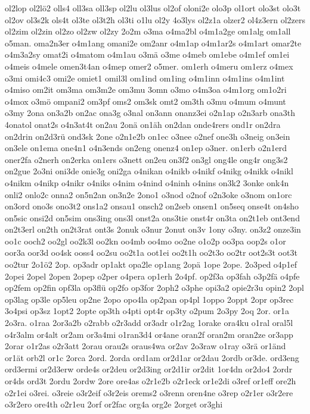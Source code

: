 {ol2lop
ol2lö2
olls4
oll3sa
oll3sp
ol2lu
ol3lus
ol2of
oloni2e
olo3p
ol1ort
olo3st
olo3t
ol2ov
ol3s2k
ols4t
ol3te
ol3t2h
ol3ti
o1lu
ol2y
4o3lys
ol2z1a
olzer2
ol4z3ern
ol2zers
ol2zim
ol2zin
ol2zo
ol2zw
ol2zy
2o2m
o3ma
o4ma2bl
o4m1a2ge
om1alg
om1all
o5man.
oma2n3er
o4m1ang
omani2e
om2anr
o4m1ap
o4m1ar2s
o4m1art
omar2te
o4m3a2sy
omat2i
o4matom
o4m1au
o3mä
o3me
o4meb
om1ebe
o4m1ef
om1ei
o4meis
o4mele
omen3t4an
o4mep
omer2
o5mer.
om1erh
o4meru
om1erz
o4mex
o3mi
omi4c3
omi2e
omiet1
omil3l
om1ind
om1ing
o4m1inn
o4m1ins
o4m1int
o4miso
om2it
om3ma
om3m2e
om3mu
3omn
o3mo
o4m3oa
o4m1org
om1o2ri
o4mox
o3mö
ompani2
om3pf
oms2
om3sk
omt2
om3th
o3mu
o4mum
o4munt
o3my
2ona
on3a2b
on2ac
ona3g
o3nal
on3ann
onanz3ei
o2n1ap
o2n3arb
ona3th
4onatol
onat2s
o4n3at4t
on2au
2onä
on1äh
on2dan
onde4rers
ond1r
on2dra
on2drin
on2d3rü
ond3sk
2one
o2n1e2b
on1ec
o3nee
o2nef
one3h
o3neig
on3ein
on3ele
on1ema
one4n1
o4n3ends
on2eng
onenz4
on1ep
o3ner.
on1erb
o2n1erd
oner2fa
o2nerh
on2erka
on1ers
o3nett
on2eu
on3f2
on3gl
ong4le
ong4r
ong3s2
on2gue
2o3ni
oni3de
onie3g
oni2ga
o4nikan
o4nikb
o4nikf
o4nikg
o4nikk
o4nikl
o4nikm
o4nikp
o4nikr
o4niks
o4nim
o4nind
o4ninh
o4nins
on3k2
3onke
onk4n
onli2
onlo2c
onna2
on5n2an
on3n2e
2ono1
o3nod
o2nof
o2n3oke
o3nom
on1orc
on3ord
ono3s
ono3t2
ons1a2
onsau1
onsch2
on2seb
onsen1
on5seq
onse4t
on4sho
on5sic
onsi2d
on5sim
ons3ing
ons3l
onst2a
ons3tie
onst4r
on3ta
on2t1eb
ont3end
on2t3erl
on2th
on2t3rat
ont3s
2onuk
o3nur
2onut
on3v
1ony
o3ny.
on3z2
onze3in
oo1c
ooch2
oo2gl
oo2k3l
oo2kn
oo4mb
oo4mo
oo2ne
o1o2p
oo3pa
oop2s
o1or
oor3a
oor3d
oo4sk
ooss4
oo2su
oo2t1a
oot1ei
oo2t1h
oo2t3o
oo2tr
oot2s3t
oot3t
oo2tur
2o1ö2
2op.
op3adr
op1akt
opa2le
op1ang
2opä
1ope
2ope.
2o3ped
o4p1ef
2opei
2opel
2open
2opep
o2per
o4pera
op1erh
2o4pf.
op2f3a
op3fah
o3p2fä
o4pfe
op2fem
op2fin
opf3la
op3flü
op2fo
op3for
2oph2
o3phe
opi3a2
opie2r3u
opin2
2opl
op3lag
op3le
op5leu
op2ne
2opo
opo4la
op2pan
op4pl
1oppo
2oppt
2opr
op3rec
3o4psi
op3sz
1opt2
2opte
op3th
o4pti
opt4r
op3ty
o2pum
2o3py
2oq
2or.
or1a
2o3ra.
o1raa
2or3a2b
o2rabb
o2r3add
or3adr
o1r2ag
1orake
ora4ku
o1ral
oral5l
o4r3alm
or4alt
or2am
or3a4mi
o1ran3d4
or4ane
oran2f
oran2m
oran2ze
or3app
2orar
o1r2as
o2r3att
2orau
orau2s
oraus4wa
or2av
2o3raw
o1ray
o3rä
or1änd
or1ät
orb2l
or1c
2orca
2ord.
2orda
ord1am
or2d1ar
or2dau
2ordb
or3de.
ord3eng
ord3ermi
or2d3erw
orde4s
or2deu
or2d3ing
or2d1ir
or2dit
1or4dn
or2do4
2ordr
or4ds
ord3t
2ordu
2ordw
2ore
ore4as
o2r1e2b
o2r1eck
or1e2di
o3ref
or1eff
ore2h
o2r1ei
o3rei.
o3reie
o3r2eif
o3r2eis
orems2
o3renn
oren4ne
o3rep
o2r1er
o3r2ere
o3r2ero
ore4th
o2r1eu
2orf
or2fac
org4a
org2e
2orget
or3ghi
}
